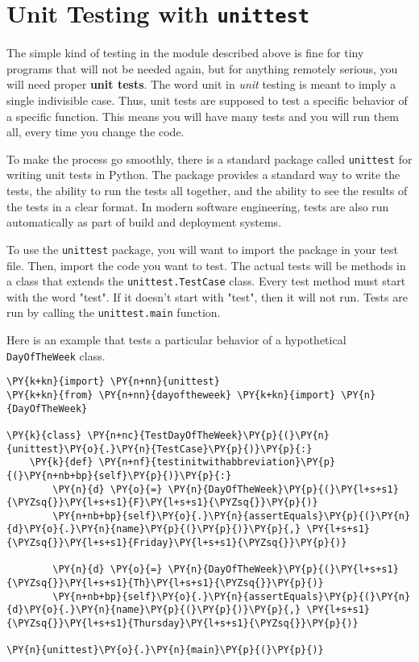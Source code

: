 \section{Unit Testing with \texttt{unittest}}


The simple kind of testing in the module described above is fine for tiny programs that will not be needed again, but for anything remotely serious, you will need proper \textbf{unit tests}.  The word unit in \emph{unit} testing is meant to imply a single indivisible case.  Thus, unit tests are supposed to test a specific behavior of a specific function.  This means you will have many tests and you will run them all, every time you change the code.  


To make the process go smoothly, there is a standard package  called \texttt{unittest} for writing unit tests in Python.  The package provides a standard way to write the tests, the ability to run the tests all together, and the ability to see the results of the tests in a clear format.  In modern software engineering, tests are also run automatically as part of build and deployment systems.


To use the \texttt{unittest} package, you will want to import the package in your test file.
Then, import the code you want to test.
The actual tests will be methods in a class that extends the \texttt{unittest.TestCase} class.
Every test method must start with the word "test".  If it doesn’t start with "test", then it will not run.
Tests are run by calling the \texttt{unittest.main} function.


Here is an example that tests a particular behavior of a hypothetical \texttt{DayOfTheWeek} class.

\begin{Verbatim}[commandchars=\\\{\}]
\PY{k+kn}{import} \PY{n+nn}{unittest}
\PY{k+kn}{from} \PY{n+nn}{dayoftheweek} \PY{k+kn}{import} \PY{n}{DayOfTheWeek}

\PY{k}{class} \PY{n+nc}{TestDayOfTheWeek}\PY{p}{(}\PY{n}{unittest}\PY{o}{.}\PY{n}{TestCase}\PY{p}{)}\PY{p}{:}
    \PY{k}{def} \PY{n+nf}{testinitwithabbreviation}\PY{p}{(}\PY{n+nb+bp}{self}\PY{p}{)}\PY{p}{:}
        \PY{n}{d} \PY{o}{=} \PY{n}{DayOfTheWeek}\PY{p}{(}\PY{l+s+s1}{\PYZsq{}}\PY{l+s+s1}{F}\PY{l+s+s1}{\PYZsq{}}\PY{p}{)}
        \PY{n+nb+bp}{self}\PY{o}{.}\PY{n}{assertEquals}\PY{p}{(}\PY{n}{d}\PY{o}{.}\PY{n}{name}\PY{p}{(}\PY{p}{)}\PY{p}{,} \PY{l+s+s1}{\PYZsq{}}\PY{l+s+s1}{Friday}\PY{l+s+s1}{\PYZsq{}}\PY{p}{)}

        \PY{n}{d} \PY{o}{=} \PY{n}{DayOfTheWeek}\PY{p}{(}\PY{l+s+s1}{\PYZsq{}}\PY{l+s+s1}{Th}\PY{l+s+s1}{\PYZsq{}}\PY{p}{)}
        \PY{n+nb+bp}{self}\PY{o}{.}\PY{n}{assertEquals}\PY{p}{(}\PY{n}{d}\PY{o}{.}\PY{n}{name}\PY{p}{(}\PY{p}{)}\PY{p}{,} \PY{l+s+s1}{\PYZsq{}}\PY{l+s+s1}{Thursday}\PY{l+s+s1}{\PYZsq{}}\PY{p}{)}     

\PY{n}{unittest}\PY{o}{.}\PY{n}{main}\PY{p}{(}\PY{p}{)}
\end{Verbatim}



